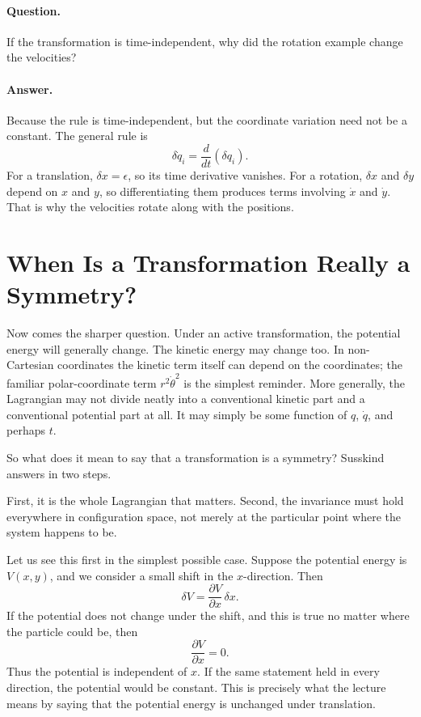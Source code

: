 \paragraph{Question.} If the transformation is time-independent, why did the rotation example change the velocities?

\paragraph{Answer.} Because the rule is time-independent, but the coordinate variation need not be a constant. The general rule is
\[
\delta \dot q_i=\frac{d}{dt}(\delta q_i).
\]
For a translation, \(\delta x=\epsilon\), so its time derivative vanishes. For a rotation, \(\delta x\) and \(\delta y\) depend on \(x\) and \(y\), so differentiating them produces terms involving \(\dot x\) and \(\dot y\). That is why the velocities rotate along with the positions.

\section{When Is a Transformation Really a Symmetry?}

Now comes the sharper question. Under an active transformation, the potential energy will generally change. The kinetic energy may change too. In non-Cartesian coordinates the kinetic term itself can depend on the coordinates; the familiar polar-coordinate term \(r^2\dot\theta^2\) is the simplest reminder. More generally, the Lagrangian may not divide neatly into a conventional kinetic part and a conventional potential part at all. It may simply be some function of \(q\), \(\dot q\), and perhaps \(t\).

So what does it mean to say that a transformation is a symmetry? Susskind answers in two steps.

First, it is the whole Lagrangian that matters. Second, the invariance must hold everywhere in configuration space, not merely at the particular point where the system happens to be.

Let us see this first in the simplest possible case. Suppose the potential energy is \(V(x,y)\), and we consider a small shift in the \(x\)-direction. Then
\begin{equation}
\delta V=\frac{\partial V}{\partial x}\,\delta x.
\end{equation}
If the potential does not change under the shift, and this is true no matter where the particle could be, then
\begin{equation}
\frac{\partial V}{\partial x}=0.
\end{equation}
Thus the potential is independent of \(x\). If the same statement held in every direction, the potential would be constant. This is precisely what the lecture means by saying that the potential energy is unchanged under translation.

